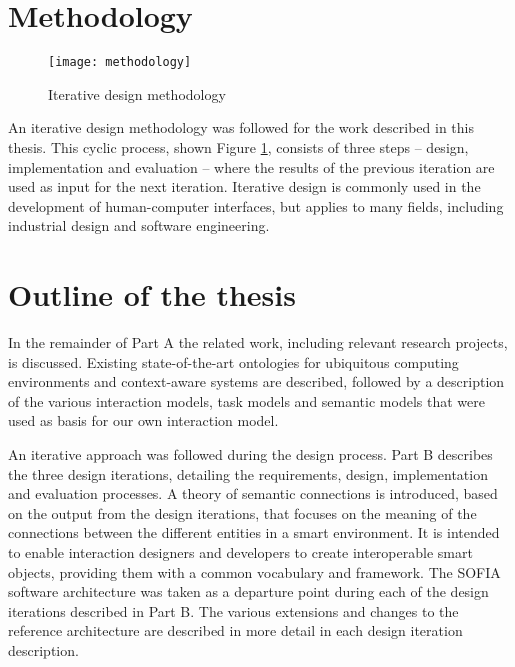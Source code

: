 
\section{Methodology}

\begin{figure}
\centering
\texttt{[image: methodology]}
\caption{Iterative design methodology}
\label{methodology}
\end{figure}


An iterative design methodology \cite{Larman2003} was followed for the work described in this thesis. This cyclic process, shown Figure \ref{methodology}, consists of three steps -- design, implementation and evaluation -- where the results of the previous iteration are used as input for the next iteration. Iterative design is commonly used in the development of human-computer interfaces, but applies to many fields, including industrial design and software engineering.

\section{Outline of the thesis}

In the remainder of Part A the related work, including relevant research projects, is discussed. Existing state-of-the-art ontologies for ubiquitous computing environments and context-aware systems are described, followed by a description of the various interaction models, task models and semantic models that were used as basis for our own interaction model. 

An iterative approach was followed during the design process. Part B describes the three design iterations, detailing the requirements, design, implementation and evaluation processes. A theory of semantic connections is introduced, based on the output from the design iterations, that focuses on the meaning of the connections between the different entities in a smart environment. It is intended to enable interaction designers and developers to create interoperable smart objects, providing them with a common vocabulary and framework. The \ac{SOFIA} software architecture was taken as a departure point during each of the design iterations described in Part B. The various extensions and changes to the reference architecture are described in more detail in each design iteration description. 

